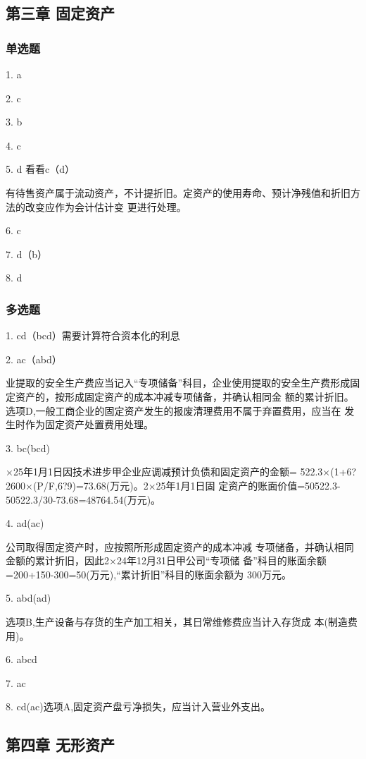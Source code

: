 \documentclass[UTF8,12pt]{ctexart}
\numberwithin{equation}{section} %
\numberwithin{figure}{section}
\numberwithin{table}{section}
\begin{document}
	\subsection{第三章 固定资产}
	
	\subsubsection{单选题}
	1. a
	
	2. c
	
	3. b
	
	4. c
	
	5. d 看看c（d）
	
	有待售资产属于流动资产，不计提折旧。定资产的使用寿命、预计净残值和折旧方法的改变应作为会计估计变
	更进行处理。
	
	6. c
	
	7. d（b）
	
	8. d
	
	\subsubsection{多选题}
	1. cd（bcd）需要计算符合资本化的利息
	
	2. ac（abd）
	
	业提取的安全生产费应当记入“专项储备”科目，企业使用提取的安全生产费形成固定资产的，按形成固定资产的成本冲减专项储备，并确认相同金
	额的累计折旧。
	选项D,一般工商企业的固定资产发生的报废清理费用不属于弃置费用，应当在
	发生时作为固定资产处置费用处理。
	
	3. bc(bcd)
	
	×25年1月1日因技术进步甲企业应调减预计负债和固定资产的金额=
	522.3×(1+6?2600×(P/F,6?9)=73.68(万元)。2×25年1月1日固
	定资产的账面价值=50522.3-50522.3/30-73.68=48764.54(万元)。
	
	4. ad(ac)
	
	公司取得固定资产时，应按照所形成固定资产的成本冲减
	专项储备，并确认相同金额的累计折旧，因此2×24年12月31日甲公司“专项储
	备”科目的账面余额=200+150-300=50(万元),“累计折旧”科目的账面余额为
	300万元。
	
	5. abd(ad)
	
	选项B,生产设备与存货的生产加工相关，其日常维修费应当计入存货成
	本(制造费用)。
	
	6. abcd
	
	7. ac
	
	8. cd(ac)选项A,固定资产盘亏净损失，应当计入营业外支出。
	
	
	\subsection{第四章 无形资产}
	
\end{document}
